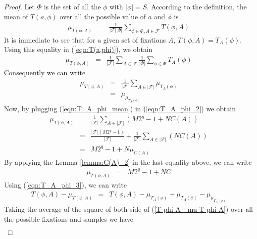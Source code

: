 \begin{proof}
Let $\Phi$ is the set of all the $\phi$ with $|\phi|=S$. According to the definition, the mean of $T\left(a,\phi\right)$ over all the possible value of $a$ and $\phi$ is
\begin{eqnarray}
\mu_{T\left(\phi,A \right)} &=& \frac{1}{|\mathcal{F}||\Phi|}\displaystyle\sum_{\phi \in \Phi, A \in \mathcal{F}}T\left(\phi,A\right) \label{eqn:T(a,phi)}
\end{eqnarray}
It is immediate to see that for a given set of fixations $A$, $T\left(\phi,A\right) = T_{A}\left(\phi\right)$. Using this equality in (\ref{eqn:T(a,phi)}), we obtain
\begin{eqnarray*}
\mu_{T\left(\phi,A \right)} &=& \frac{1}{|\mathcal{F}|}\displaystyle\sum_{A \in \mathcal{F}}\frac{1}{|\Phi|}\displaystyle\sum_{\phi \in \Phi}T_{A}\left(\phi\right) \label{eqn:T_phi_A_1}
\end{eqnarray*}
Consequently we can write 
\begin{eqnarray}
\mu_{T\left(\phi,A \right)} &=& \frac{1}{|\mathcal{F}|}\displaystyle\sum_{A \in |\mathcal{F}|}\mu_{T_{A}(\phi)} \label{eqn:T_A_phi_2}\\ 
&=& \mu_{\mu_{T_{A}(\phi)}} \label{eqn:T_A_phi_3}
\end{eqnarray}
Now, by plugging (\ref{eqn:T_A_phi_mean}) in (\ref{eqn:T_A_phi_2}) we obtain
\begin{eqnarray*}
\mu_{T\left(\phi,A \right)} &=& \frac{1}{|\mathcal{F}|}\displaystyle\sum_{A \in |\mathcal{F}|}(M2^q-1+NC(A))\\
&=& \frac{|\mathcal{F}|(M2^q-1)}{|\mathcal{F}|}+\frac{1}{|\mathcal{F}|}\displaystyle\sum_{A \in |\mathcal{F}|}(NC(A))\\
&=& M2^q-1 + N\mu_{C(A)}
\end{eqnarray*}
By applying the Lemma \ref{lemma:C(A)_2} in the last equality above, we can write
\begin{eqnarray}
\mu_{T\left(\phi,A \right)} &=& M2^q-1 + NC
\end{eqnarray}
Using (\ref{eqn:T_A_phi_3}), we can write 
\begin{eqnarray}
T\left(\phi,A\right) - \mu_{T\left(\phi,A\right)} &=& T\left(\phi,A\right) - \mu_{T_{A}(\phi)} + \mu_{T_{A}(\phi)} - \mu_{\mu_{T_{A}(\phi)}} \label{T phi A - mu T phi A}
\end{eqnarray} Taking the average of the square of both side of (\ref{T phi A - mu T phi A}) over all the possible fixations and samples we have 
\begin{eqnarray*}

\end{eqnarray*}
\end{proof}
